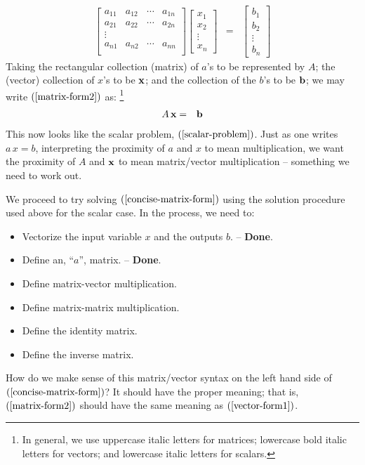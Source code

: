 \documentclass{article}
\begin{document}
\begin{eqnarray}
  \left[
  \begin{array}{cccc}
    a_{11} & a_{12} & \cdots & a_{1n} \\
    a_{21} & a_{22} & \cdots & a_{2n} \\
    \vdots \\
    a_{n1} & a_{n2} & \cdots & a_{nn} \\
    \end{array}
  \right]
  \left[
  \begin{array}{c}
    x_1 \\
    x_2 \\
    \vdots \\
    x_n
  \end{array}
  \right] & = &
                \left[
                \begin{array}{c}
                  b_1 \\
                  b_2 \\
                  \vdots \\
                  b_n
                \end{array}
  \right] \label{matrix-form2}
\end{eqnarray}
Taking the rectangular collection (matrix) of $a$'s to be represented by 
$A$; the (vector) collection
of $x$'s to be ${\bf x}$; and the collection of the $b$'s to be ${\bf b}$;
we may write $(\ref{matrix-form2})$ as:%
\footnote{In general, we use uppercase italic letters for matrices; lowercase bold italic letters
for vectors; and lowercase italic letters for scalars.}
\begin{eqnarray}
  A \, {\bf x} & = & {\bf b} \label{concise-matrix-form}
\end{eqnarray}
This now looks like the scalar problem, $(\ref{scalar-problem})$.
Just as one writes $a \, x = b$, interpreting the proximity of $a$ and $x$ to mean
multiplication, we want the proximity of $A$ and ${\bf x}$ to mean matrix/vector
multiplication -- something we need to work out.

We proceed to try solving $(\ref{concise-matrix-form})$ using the solution 
procedure used above for the scalar case. In the process, we need to:
\begin{itemize}
    \item{Vectorize the input variable $x$ and the outputs $b$. -- {\bf Done}.}
    \item{Define an, ``$a$'', matrix. -- {\bf Done}.}
    \item{Define matrix-vector multiplication.}
    \item{Define matrix-matrix multiplication.}
    \item{Define the identity matrix.}
    \item{Define the inverse matrix.}
\end{itemize}
How do we make sense of this matrix/vector syntax on the left hand side of 
$(\ref{concise-matrix-form})$? It should have
the proper meaning; that is, $(\ref{matrix-form2})$
should have the same meaning as $(\ref{vector-form1})$.
\end{document}
